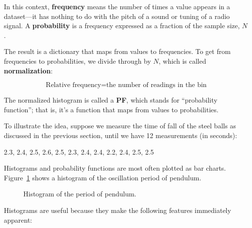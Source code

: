 

In this context, \textbf{frequency} means the number of times a value
appears in a dataset---it has nothing to do with the pitch of a sound
or tuning of a radio signal.  A \textbf{probability} is a frequency expressed
as a fraction of the sample size, $N$.


The result is a dictionary that maps from values to frequencies.
To get from frequencies to probabilities, we divide through by $N$,
which is called \textbf{normalization}:

\begin{equation}
\text{Relative frequency} = \text{the number of readings in the bin}
\end{equation}

The normalized histogram is called a \textbf{PF}, which stands for
``probability function''; that is, it's a function that maps from
values to probabilities.

To illustrate the idea, suppose we measure the time of fall of the steel balls  as discussed in the previous section, until we have 12 measurements (in seconds):

2.3, 2.4, 2.5, 2.6, 2.5, 2.3, 2.4, 2.4, 2.2, 2.4, 2.5, 2.5

Histograms and probability functions are most often plotted as bar charts.  Figure~\ref{pendulum} shows a histogram of the oscillation period of pendulum. 

\begin{figure}[h]
\begin{center}
\end{center}
\caption{ \quad Histogram of the period of pendulum.}
\label{pendulum}
\end{figure}

Histograms are useful because they make the following features immediately
apparent:

